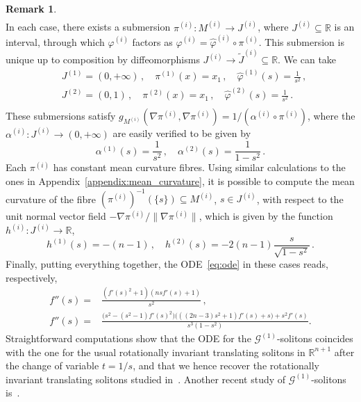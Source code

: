 \documentclass[oneside,12pt]{amsart}
\theoremstyle{definition}
\newtheorem{remark}[lemma]{Remark}
\newcommand{\R}{\mathbb{R}}
\begin{document}
\begin{remark}
\begin{align*}
\end{align*}
In each case, there exists a submersion $\pi^{(i)} \colon M^{(i)} \to J^{(i)}$, where $J^{(i)} \subseteq \R$ is an interval, through which $\varphi^{(i)}$ factors as $\varphi^{(i)} = \widehat{\varphi}^{(i)} \circ \pi^{(i)}$. This submersion is unique up to composition by diffeomorphisms $J^{(i)} \to \widetilde{J}^{(i)} \subseteq \R$. We can take
    \begin{align*}
        &J^{(1)} = (0,+\infty) \, , \quad \pi^{(1)}(x) = x_1 \, , \quad \widehat{\varphi}^{(1)} (s) = \frac{1}{s^2} \, , \\
        &J^{(2)} = (0,1) \, , \quad \pi^{(2)}(x) = x_1 \, , \quad \widehat{\varphi}^{(2)} (s) = \frac{1}{s^2} \, .\\
    \end{align*}
    These submersions satisfy $g_{M^{(i)}} \left( \nabla \pi^{(i)} , \nabla \pi^{(i)} \right) = 1/\left(\alpha^{(i)} \circ \pi^{(i)}\right)$, where the $\alpha^{(i)} \colon J^{(i)} \to (0 , +\infty)$ are easily verified to be given by
    \[ \alpha^{(1)}(s) = \frac{1}{s^2} \, , \quad \alpha^{(2)}(s) = \frac{1}{1-s^2} \, .
    \]
    Each $\pi^{(i)}$ has constant mean curvature fibres. Using similar calculations to the ones in Appendix~\ref{appendix:mean_curvature}, it is possible to compute the mean curvature of the fibre $\left(\pi^{(i)}\right)^{-1}(\{s\})\subseteq M^{(i)}$, $s\in J^{(i)}$, with respect to the unit normal vector field $- \nabla \pi^{(i)} / \lVert \nabla \pi^{(i)} \rVert$, which  is given by the function $h^{(i)} \colon J^{(i)} \to \R$,
     \[ h^{(1)}(s) = -(n-1) \, , 
     \quad h^{(2)}(s) = -2(n-1) \frac{s}{\sqrt{1-s^2}} \, . \]
    Finally, putting everything together, the ODE~\eqref{eq:ode} in these cases reads, respectively, 
    \begin{align*}
        f''(s) =& \frac{\left(f'(s)^2+1\right) \left(n s f'(s)+1\right)}{s^2} \, , \\  \label{ode3}
        f''(s) =& \frac{\big(s^2-\left(s^2-1\right) f'(s)^2\big) \big(\left((2 n-3) s^2+1\right) f'(s)+s\big)+s^2 f'(s)}{s^3 \left(1-s^2\right)}.
    \end{align*}
Straightforward computations show that the ODE for the $\mathcal{G}^{(1)}$-solitons coincides with the one for the usual rotationally invariant translating solitons in $\R^{n+1}$ after the change of variable $t = 1/s$, and that we hence recover the rotationally invariant translating solitons studied in~\cite{MROSHS}. Another recent study of $\mathcal{G}^{(1)}$-solitons is~\cite{BL24}. 


\end{remark}
\end{document}
